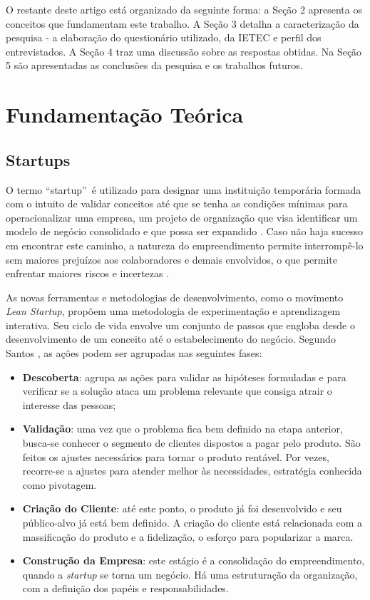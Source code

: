 \documentclass{sig-alternate-05-2015}
\begin{document}
O restante deste artigo está organizado da seguinte forma: a Seção 2 apresenta os conceitos que fundamentam este trabalho. A Seção 3 detalha a caracterização da pesquisa - a elaboração do questionário utilizado, da IETEC e perfil dos entrevistados. A Seção 4 traz uma discussão sobre as respostas obtidas. Na Seção 5 são apresentadas as conclusões da pesquisa e os trabalhos futuros.\\


\section{Fundamentação Teórica}
\subsection{{\subsecit Startups}}
O termo \textquotedblleft startup\textquotedblright\ é utilizado para designar uma instituição temporária formada com o intuito de validar conceitos até que se tenha as condições mínimas para operacionalizar uma empresa, um projeto de organização que visa identificar um modelo de negócio consolidado e que possa ser expandido \cite{blankdorf-12}. Caso não haja sucesso em encontrar este caminho, a natureza do empreendimento permite interrompê-lo sem maiores prejuízos aos colaboradores e demais envolvidos, o que permite enfrentar maiores riscos e incertezas \cite{ries-2011}.

As novas ferramentas e metodologias de desenvolvimento, como o movimento \textit{Lean Startup}, propõem uma metodologia de experimentação e aprendizagem interativa. Seu ciclo de vida envolve um conjunto de passos que engloba desde o desenvolvimento de um conceito até o estabelecimento do negócio. Segundo Santos \cite{santos-2015}, as ações podem ser agrupadas nas seguintes fases: 

\begin{itemize}
	\item \textbf{Descoberta}: agrupa as ações para validar as hipóteses formuladas e para verificar se a solução ataca um problema relevante que consiga atrair o interesse das pessoas; 
	\item \textbf{Validação}: uma vez que o problema fica bem definido na etapa anterior, busca-se conhecer o segmento de clientes dispostos a pagar pelo produto. São feitos os ajustes necessários para tornar o produto rentável. Por vezes, recorre-se a ajustes para atender melhor às necessidades, estratégia conhecida como pivotagem.
	\item \textbf{Criação do Cliente}: até este ponto, o produto já foi desenvolvido e seu público-alvo já está bem definido. A criação do cliente está relacionada com a massificação do produto e a fidelização, o esforço para popularizar a marca. 
	\item \textbf{Construção da Empresa}: este estágio é a consolidação do empreendimento, quando a \textit{startup} se torna um negócio. Há uma estruturação da organização, com a definição dos papéis e responsabilidades.
\end{itemize}
\end{document}
